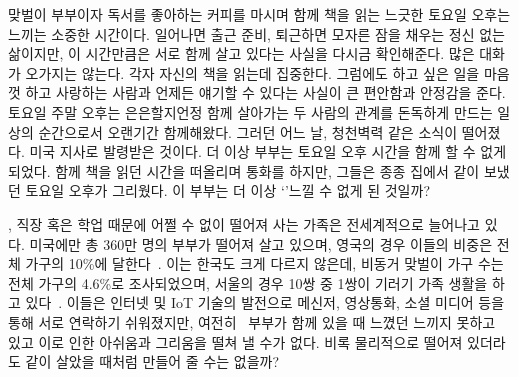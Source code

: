 
맞벌이 부부이자 독서를 좋아하는 \B\와  커피를 마시며 함께 책을 읽는 느긋한 토요일 오후는 \concept\를 느끼는 소중한 시간이다. 일어나면 출근 준비, 퇴근하면 모자른 잠을 채우는 정신 없는 삶이지만, 이 시간만큼은 서로 함께 살고 있다는 사실을 다시금 확인해준다. 많은 대화가 오가지는 않는다. 각자 자신의 책을 읽는데 집중한다. 그럼에도 하고 싶은 일을 마음껏 하고 사랑하는 사람과 언제든 얘기할 수 있다는 사실이 \A\와  큰 편안함과 안정감을 준다. 토요일 주말 오후는 은은할지언정 함께 살아가는 두 사람의 관계를 돈독하게 만드는 일상의 순간으로서 오랜기간 함께해왔다. 그러던 어느 날, 청천벽력 같은 소식이 떨어졌다. \A\가 미국 지사로 발령받은 것이다. 더 이상 부부는 토요일 오후 시간을 함께 할 수 없게 되었다. 함께 책을 읽던 시간을 떠올리며 통화를 하지만, 그들은 종종 집에서 같이 보냈던 토요일 오후가 그리웠다. 이 부부는 더 이상 `\concept'\을 느낄 수 없게 된 것일까?

\A\와 , 직장 혹은 학업 때문에 어쩔 수 없이 떨어져 사는 가족은 전세계적으로 늘어나고 있다. 미국에만 총 360만 명의 부부가 떨어져 살고 있으며, 영국의 경우 이들의 비중은 전체 가구의 10\%에 달한다~\cite{duncan2013people, strohm2009living}. 이는 한국도 크게 다르지 않은데, 비동거 맞벌이 가구 수는 전체 가구의 4.6\%로 조사되었으며, 서울의 경우 10쌍 중 1쌍이 기러기 가족 생활을 하고 있다~\cite{rock2016goose, wise2012seoul}. 이들은 인터넷 및 IoT 기술의 발전으로 메신저, 영상통화, 소셜 미디어 등을 통해 서로 연락하기 쉬워졌지만, 여전히 \A\와 \B\ 부부가 함께 있을 때 느꼈던 \concept\을 느끼지 못하고 있고 이로 인한 아쉬움과 그리움을 떨쳐 낼 수가 없다. 비록 물리적으로 떨어져 있더라도 같이 살았을 때처럼 \concept\을 만들어 줄 수는 없을까? 

